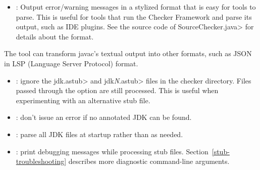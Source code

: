 \begin{itemize}

\item {}: Output error/warning messages in a
  stylized format that is easy for tools to parse.  This is useful for
  tools that run the Checker Framework and parse its output, such as IDE
  plugins.  See the source code of \<SourceChecker.java> for details about
  the format.

\end{itemize}

The
tool can transform javac's textual output into other formats, such as JSON
in LSP (Language Server Protocol) format.



\begin{itemize}

\item {}:
  ignore the \<jdk.astub> and \<jdk\emph{N}.astub> files in the checker directory. Files passed
  through the  option are still processed. This is useful
  when experimenting with an alternative stub file.

\item {}:
  don't issue an error if no annotated JDK can be found.

\item {}:
  parse all JDK files at startup rather than as needed.

\item {}:
  print debugging messages while processing stub files.
  Section~\ref{stub-troubleshooting} describes more diagnostic command-line
  arguments.

\end{itemize}


